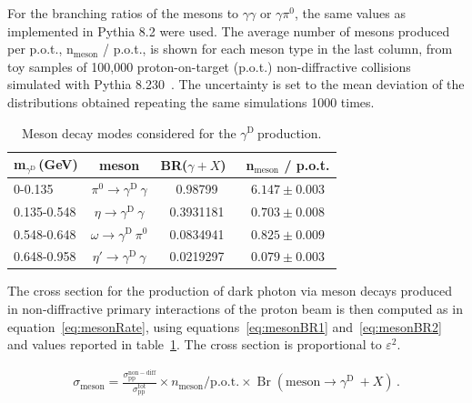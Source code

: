 \documentclass[12pt,a4paper,]{article}
\newcommand{\mathDP}{\gamma^{\mathrm{D}}\ }
\newcommand{\DP}{$\mathDP$}
\newcommand{\mDP}{m$_{\mathDP}$}
\newcommand{\Br}{\mathop\mathrm{Br}}
\begin{document}
For the branching ratios of the mesons to $\gamma\gamma$ or
$\gamma\pi^0$, the same values as implemented in Pythia 8.2 were
used. The average number of mesons produced per p.o.t.,
n$_{\mathrm{meson}}$ / p.o.t., is shown for each meson type in the
last column, from toy samples of 100,000 proton-on-target (p.o.t.)
non-diffractive collisions simulated with Pythia
8.230~\cite{Sjostrand:2014zea}. The uncertainty is set to the mean
deviation of the distributions obtained repeating the same simulations
1000 times.


\begin{table}[thbp]
  \centering
  \begin{tabular}{|l|c|c|c|}
\hline
\mDP (GeV) & meson &  BR($\gamma+X$)~\cite{Sjostrand:2014zea} & n$_{\mathrm{meson}}$ / p.o.t. \\
\hline 
0-0.135  &    $\pi^{0}\rightarrow\mathDP\gamma$ &  0.98799 &  $6.147 \pm 0.003$ \\
0.135-0.548  &   $\eta\rightarrow\mathDP\gamma$ &  0.3931181 &  $0.703 \pm 0.008$\\
0.548-0.648  &   $\omega\rightarrow\mathDP\pi^0$ & 0.0834941 &  $0.825 \pm 0.009$ \\
0.648-0.958  &    $\eta'\rightarrow\mathDP\gamma$ & 0.0219297 & $0.079 \pm 0.003$ \\
\hline
\end{tabular}
  \caption{Meson decay modes considered for the \DP production.}
  \label{tab:mesonDecays}
\end{table}


The cross section for the production of dark photon via meson decays
produced in non-diffractive primary interactions of the proton beam is
then computed as in equation~\ref{eq:mesonRate}, using
equations~\ref{eq:mesonBR1} and~\ref{eq:mesonBR2} and values reported
in table~\ref{tab:mesonDecays}. The cross section is proportional to
$\varepsilon^2$.

\begin{align}
	\sigma_{\mathrm{meson}} = \frac{\sigma_{\mathrm{pp}}^{\mathrm{non-diff}}}{\sigma_{\mathrm{pp}}^{\mathrm{tot}}} \times n_{\mathrm{meson}} \mathrm{/ p.o.t.} \times \Br(\mathrm{meson}\to \mathDP+X)\,.\label{eq:mesonRate}
\end{align}
\end{document}
